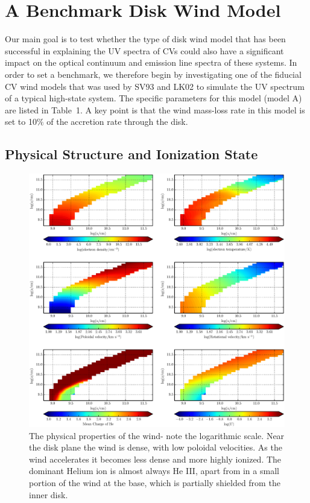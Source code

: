 \documentclass[preprint, a4paper, 11pt]{aastex}
\begin{document}
\section{A Benchmark Disk Wind Model}
\label{modela}

Our main goal is to test whether the type of disk wind model that has
been successful in explaining the UV spectra of CVs could also have a
significant impact on the optical continuum and emission line spectra
of these systems. In order to set a benchmark, we therefore begin by
investigating one of the fiducial CV wind models that was used by SV93
and LK02 to simulate the UV spectrum of a typical high-state
system. The specific parameters for this model (model A) are listed in
Table~1. A key point is that the wind mass-loss rate in this model is
set to 10$\%$ of the accretion rate through the disk.

\subsection{Physical Structure and Ionization State}
\label{modela_ionization}

\begin{figure} %
\includegraphics[width=\textwidth]{figures/fig5.eps}
\caption{
The physical properties of the wind- note the logarithmic scale. 
Near the disk plane the wind is dense, with low poloidal velocities.
As the wind accelerates it becomes less dense
and more highly ionized. The dominant Helium ion
is almost always He III, apart from in a small
portion of the wind at the base, which is partially shielded
from the inner disk.
}
\label{wind}
\end{figure} %
\end{document}
